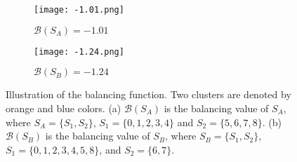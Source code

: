 \begin{figure}
    \centering
    \begin{subfigure}[b]{0.4\textwidth}
    \centering
        \texttt{[image: -1.01.png]}
        \caption{$\mathcal{B}(S_A)=-1.01$}
    \end{subfigure}
    \hfill
    \quad
    \begin{subfigure}[b]{0.4\textwidth}
        \texttt{[image: -1.24.png]}
        \caption{$\mathcal{B}(S_B)=-1.24$}
    \end{subfigure}
    \hfill

    \caption{Illustration of the balancing function. Two clusters are denoted by orange and blue colors. (a) $\mathcal{B}(S_A)$ is the balancing value of $S_A$, where $S_A=\{S_1,S_2\}$, $S_1=\{0,1,2,3,4\}$ and $S_2=\{5,6,7,8\}$. (b) $\mathcal{B}(S_B)$ is the balancing value of $S_B$, where $S_B=\{S_1,S_2\}$, $S_1=\{0,1,2,3,4,5,8\}$, and $S_2=\{6,7\}$.
    }
    \label{balancing-func}
\end{figure}

